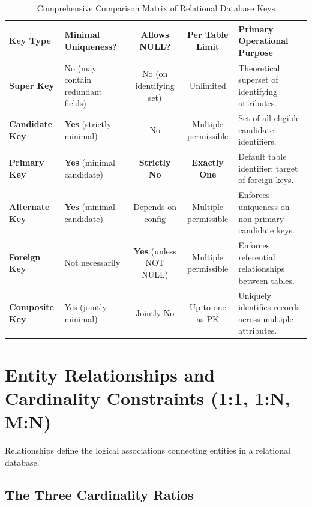 \begin{table}[htbp]
\centering
\caption{Comprehensive Comparison Matrix of Relational Database Keys}
\label{tab:relational_keys_comparison}
\begin{tabularx}{\textwidth}{p{2.8cm} p{3.2cm} c c X}
\toprule
\textbf{Key Type} & \textbf{Minimal Uniqueness?} & \textbf{Allows NULL?} & \textbf{Per Table Limit} & \textbf{Primary Operational Purpose} \\
\midrule
\textbf{Super Key} & No (may contain redundant fields) & No (on identifying set) & Unlimited & Theoretical superset of identifying attributes. \\
\textbf{Candidate Key} & \textbf{Yes} (strictly minimal) & No & Multiple permissible & Set of all eligible candidate identifiers. \\
\textbf{Primary Key} & \textbf{Yes} (minimal candidate) & \textbf{Strictly No} & \textbf{Exactly One} & Default table identifier; target of foreign keys. \\
\textbf{Alternate Key} & \textbf{Yes} (minimal candidate) & Depends on config & Multiple permissible & Enforces uniqueness on non-primary candidate keys. \\
\textbf{Foreign Key} & Not necessarily & \textbf{Yes} (unless NOT NULL) & Multiple permissible & Enforces referential relationships between tables. \\
\textbf{Composite Key} & Yes (jointly minimal) & Jointly No & Up to one as PK & Uniquely identifies records across multiple attributes. \\
\bottomrule
\end{tabularx}
\end{table}

\newpage
\section{Entity Relationships and Cardinality Constraints (1:1, 1:N, M:N)}

Relationships define the logical associations connecting entities in a relational database.

\subsection{The Three Cardinality Ratios}

